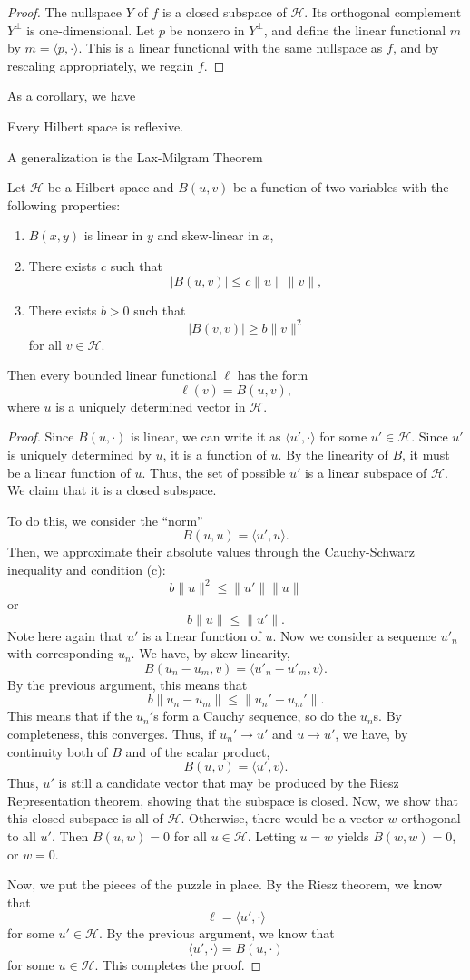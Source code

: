 \documentclass[twoside,symmetric, openany, 12pt]{./tuftebook}
\theoremstyle{definition}
\theoremstyle{definition}
\theoremstyle{definition}
\newenvironment{parts}{\begin{enumerate}[label=(\alph*)]}{\end{enumerate}}
\begin{document}
\begin{proof}
The nullspace $Y$ of $f$ is a closed subspace of $\mathcal{H}$. Its orthogonal complement $Y^\perp$ is one-dimensional. Let $p$ be nonzero in $Y^\perp$, and define the linear functional $m$ by $m = \langle p, \cdot \rangle$. This is a linear functional with the same nullspace as $f$, and by rescaling appropriately, we regain $f$. 	
\end{proof}
As a corollary, we have
\begin{Corollary}
	Every Hilbert space is reflexive.
\end{Corollary}
A generalization is the Lax-Milgram Theorem
\begin{Theorem}
	Let $\mathcal{H}$ be a Hilbert space and $B(u, v)$ be a function of two variables with the following properties:
	\begin{parts}
		\item $B(x,y)$ is linear in $y$ and skew-linear in $x$,
		\item There exists $c$ such that
		\[|B(u,v)|\le c \|u\| \|v\|,\]
		\item There exists $b>0$ such that
		\[|B(v,v)|\ge b\|v\|^2\]
		for all $v\in \mathcal{H}$.
	\end{parts}
Then every bounded linear functional $\ell$ has the form
\[\ell(v) = B(u, v),\]
where $u$ is a uniquely determined vector in $\mathcal{H}$.
\end{Theorem}
\begin{proof}
Since $B(u, \cdot)$ is linear, we can write it as $\langle u', \cdot \rangle$ for some $u'\in \mathcal{H}$. Since $u'$ is uniquely determined by $u$, it is a function of $u$. By the linearity of $B$, it must be a linear function of $u$. Thus, the set of possible $u'$ is a linear subspace of $\mathcal{H}$. We claim that it is a closed subspace.

To do this, we consider the ``norm''
\[B(u, u) = \langle u', u\rangle.\]
Then, we approximate their absolute values through the Cauchy-Schwarz inequality and condition (c):
\[b \| u\|^2 \le \|u'\|\|u\|\]
or
\[b \|u\| \le \|u'\|.\]
Note here again that $u'$ is a linear function of $u$. Now we consider a sequence $u'_n$ with corresponding $u_n$. We have, by skew-linearity,
\[B(u_n - u_m, v) = \langle u'_n - u'_m, v\rangle.\]
By the previous argument, this means that
\[b\|u_n-u_m\| \le \|u_n' - u_m'\|.\]
This means that if the $u_n'$s form a Cauchy sequence, so do the $u_n$s. By completeness, this converges. Thus, if $u_n'\to u'$ and $u\to u'$, we have, by continuity both of $B$ and of the scalar product,
\[B(u, v) = \langle u', v\rangle.\]
Thus, $u'$ is still a candidate vector that may be produced by the Riesz Representation theorem, showing that the subspace is closed. Now, we show that this closed subspace is all of $\mathcal{H}$. Otherwise, there would be a vector $w$ orthogonal to all $u'$. Then $B(u, w)=0$ for all $u\in \mathcal{H}$. Letting $u=w$ yields $B(w,w)=0$, or $w=0$.

Now, we put the pieces of the puzzle in place. By the Riesz theorem, we know that
\[\ell = \langle u', \cdot\rangle\]
for some $u'\in \mathcal{H}$. By the previous argument, we know that
\[\langle u',\cdot \rangle = B(u, \cdot)\]
for some $u\in \mathcal{H}$. This completes the proof.
\end{proof}
\end{document}
